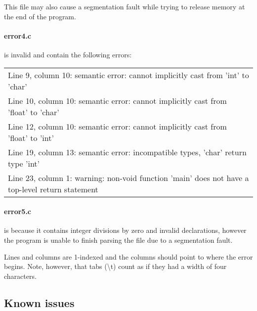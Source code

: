 This file may also cause a segmentation fault while trying to release memory at the end of the program.


\paragraph{error4.c} is invalid and contain the following errors:

\begin{tabular}{l}
Line 9, column 10: semantic error: cannot implicitly cast from 'int' to 'char' \\
Line 10, column 10: semantic error: cannot implicitly cast from 'float' to 'char'  \\
Line 12, column 10: semantic error: cannot implicitly cast from 'float' to 'int'  \\
Line 19, column 13: semantic error: incompatible types, 'char' return type 'int'  \\
Line 23, column 1: warning: non-void function 'main' does not have a top-level return statement  \\
\end{tabular}


\paragraph{error5.c} is because it contains integer divisions by zero and invalid declarations, however
the program is unable to finish parsing the file due to a segmentation fault.


Lines and columns are 1-indexed and the columns should point to where the error begins.
Note, however, that tabs (\textbackslash t) count as if they had a width of four characters.


\subsection{Known issues}

